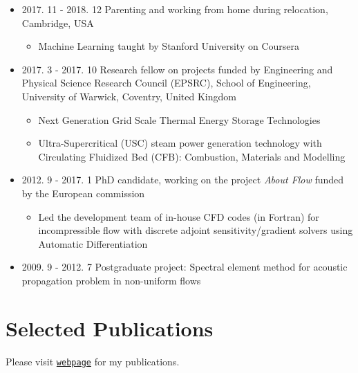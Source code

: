 \documentclass[letterpaper]{article}
\begin{document}
\begin{itemize}
\item 2017. 11 - 2018. 12 \hspace{2pt} Parenting and working from home during relocation, Cambridge, USA
		\begin{itemize}
		\item Machine Learning taught by Stanford University on Coursera
		\end{itemize}		
\item 2017. 3 - 2017. 10  \hspace{2pt} Research fellow on projects funded by Engineering and Physical Science Research Council (EPSRC), School of Engineering, University of Warwick, Coventry, United Kingdom
		\begin{itemize}
		\item Next Generation Grid Scale Thermal Energy Storage Technologies

		\item	Ultra-Supercritical (USC) steam power generation technology with Circulating Fluidized Bed (CFB): Combustion, Materials and Modelling

		\end{itemize}

\item 2012. 9 - 2017. 1  \hspace{2pt} PhD candidate, working on the project \textsl{About Flow} funded by the European commission
		\begin{itemize}
		\item Led the development team of in-house CFD codes (in Fortran) for incompressible flow with discrete adjoint sensitivity/gradient solvers using Automatic Differentiation
%		
		\end{itemize}
		
\item 2009. 9 - 2012. 7  \hspace{2pt} Postgraduate project: Spectral element method for acoustic propagation problem in non-uniform flows


		
\end{itemize}

\section*{Selected Publications}
Please visit \href{https://raw.githubusercontent.com/guliyolanda/CV/master/YW-papers.pdf} {\tt webpage} for  my publications. 
\end{document}
